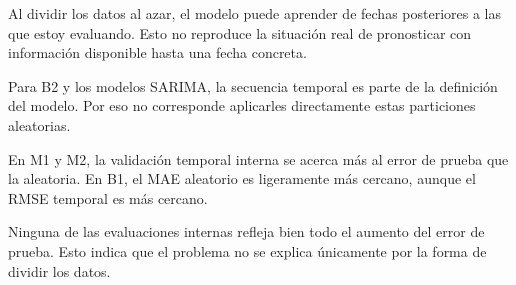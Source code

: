 \documentclass[11pt,letterpaper]{article}
\begin{document}
\begin{table}[H]
\centering
\small
\caption{Errores en libras. En la validación aleatoria se reporta media $\pm$ desviación estándar entre semillas.}
\end{table}

Al dividir los datos al azar, el modelo puede aprender de fechas posteriores a las que estoy evaluando. Esto no reproduce la situación real de pronosticar con información disponible hasta una fecha concreta.

Para B2 y los modelos SARIMA, la secuencia temporal es parte de la definición del modelo. Por eso no corresponde aplicarles directamente estas particiones aleatorias.

En M1 y M2, la validación temporal interna se acerca más al error de prueba que la aleatoria. En B1, el MAE aleatorio es ligeramente más cercano, aunque el RMSE temporal es más cercano.

Ninguna de las evaluaciones internas refleja bien todo el aumento del error de prueba. Esto indica que el problema no se explica únicamente por la forma de dividir los datos.
\end{document}
